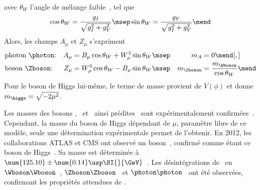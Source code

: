 avec $\theta_W$ l'angle de mélange faible~\cite{GLASHOW1961579}, tel que
\begin{equation}
\cos\theta_W = \frac{g_I}{\sqrt{g_I^2 + g_Y^2}}
\msep
\sin\theta_W = \frac{g_Y}{\sqrt{g_I^2 + g_Y^2}}
\mend
\label{eq-chapter-MS-MSSM-section-formalisme-subsec-Higgs_mechanism-thetaW}
\end{equation}
Alors, les champs $A_\mu$ et $Z_\mu$ s'expriment
\begin{align}
&
\text{photon \photon:}
&
A_\mu &= B_\mu \cos\theta_W + W_\mu^3 \sin\theta_W
\msep&
m_A &= 0
\mend[,]
\\
&
\text{boson \Zboson:}
&
Z_\mu &= W_\mu^3 \cos\theta_W - B_\mu \sin\theta_W
\msep&
m_{\Zboson} &= \frac{m_{\Wboson}}{\cos\theta_W}
\mend
\end{align}
Pour le boson de Higgs lui-même, le terme de masse provient de $V(\phi)$ et donne $m_{\higgs} = \sqrt{-2\mu^2}$.
\par Les masses des bosons \Wbosonpm, \photon\ et \Zboson\ ainsi prédites~\cite{Weinberg_leptons_model} sont expérimentalement confirmées~\cite{PDG_booklet_2020,Wboson_discovery1,Wboson_discovery2,Wboson_discovery3,Zboson_discovery1,Zboson_discovery2}.
Cependant, la masse du boson de Higgs dépendant de $\mu$, paramètre libre de ce modèle, seule une détermination expérimentale permet de l'obtenir. En 2012, les collaborations ATLAS et CMS ont observé un boson~\cite{ATLAS_Higgs_discovery,CMS_Higgs_discovery,CMS_Higgs_discovery_2013}, confirmé comme étant ce boson de Higgs~\cite{ATLAS-CMS-Higgs_combined_1,ATLAS-CMS-Higgs_combined_2}. Sa masse est déterminée à $\num{125.10}\pm\num{0.14}\usp\SI{}{\GeV}$~\cite{PDG_booklet_2020,2020135425,PhysRevD.99.112003}.
Les désintégrations de \higgs\ en
$\Wboson\Wboson$~\cite{higgs_WW},
$\Zboson\Zboson$~\cite{CMS-PAS-HIG-13-002,PhysRevD.89.092007}
et
$\photon\photon$~\cite{higgs_diphoton}
ont été observées, confirmant les propriétés attendues de \higgs.

